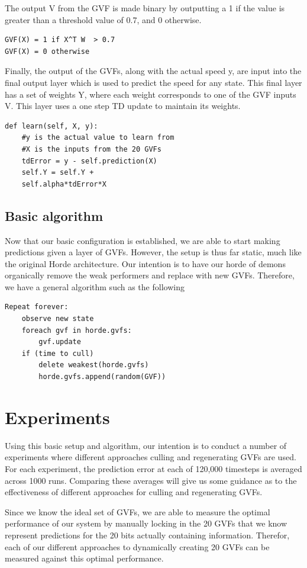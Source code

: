 \documentclass[letterpaper]{article}
\begin{document}
The output V from the GVF is made binary by outputting a 1 if the value is greater than a threshold value of 0.7, and 0 otherwise. 

\begin{lstlisting}
GVF(X) = 1 if X^T W  > 0.7
GVF(X) = 0 otherwise
\end{lstlisting}

Finally, the output of the GVFs, along with the actual speed y, are input into the final output layer which is used to predict the speed for any state. This final layer has a set of weights Y, where each weight corresponds to one of the GVF inputs V. This layer uses a one step TD update to maintain its weights.

\begin{lstlisting}
def learn(self, X, y):
    #y is the actual value to learn from
    #X is the inputs from the 20 GVFs
    tdError = y - self.prediction(X)
    self.Y = self.Y + 
    self.alpha*tdError*X
\end{lstlisting}

\subsection{Basic algorithm}
Now that our basic configuration is established, we are able to start making predictions given a layer of GVFs. However, the setup is thus far static, much like the original Horde architecture. Our intention is to have our horde of demons organically remove the weak performers and replace with new GVFs. Therefore, we have a general algorithm such as the following 
\begin{lstlisting}
Repeat forever:
	observe new state
	foreach gvf in horde.gvfs:
		gvf.update
	if (time to cull)
		delete weakest(horde.gvfs)
		horde.gvfs.append(random(GVF))
\end{lstlisting}	

\section{Experiments}
Using this basic setup and algorithm, our intention is to conduct a number of experiments where different approaches culling and regenerating GVFs are used. For each experiment, the prediction error at each of 120,000 timesteps is averaged across 1000 runs. Comparing these averages will give us some guidance as to the effectiveness of different approaches for culling and regenerating GVFs. 

Since we know the ideal set of GVFs, we are able to measure the optimal performance of our system by manually locking in the 20 GVFs that we know represent predictions for the 20 bits actually containing information. Therefor, each of our different approaches to dynamically creating 20 GVFs can be measured against this optimal performance.
\end{document}
